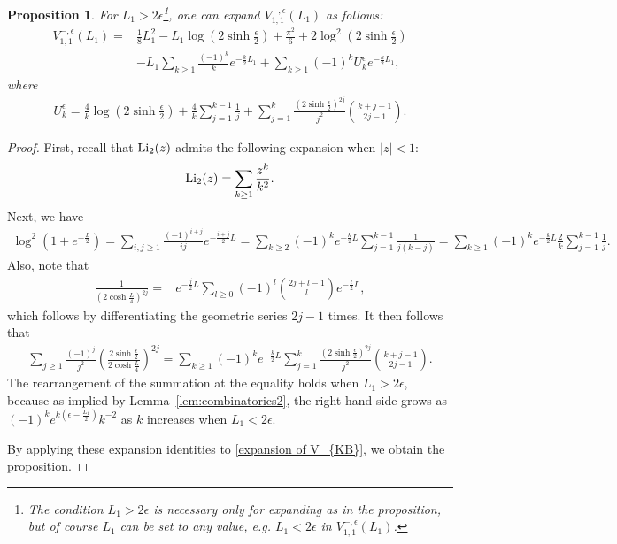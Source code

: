 \documentclass[12pt]{amsart}
\theoremstyle{plain}
\newtheorem{proposition}[theorem]{Proposition}
\theoremstyle{definition}
\theoremstyle{remark}
\numberwithin{equation}{section}
\begin{document}
\begin{proposition}\label{prop:expansion of V_KB} For $L_1>2\epsilon$\footnote{The condition $L_1>2\epsilon$ is necessary only for expanding as in the proposition, but of course $L_1$ can be set to any value, e.g. $L_1<2\epsilon$ in $V_{1,1}^{-,\epsilon}(L_1)$.}, one can expand $V_{1,1}^{-,\epsilon}(L_1)$ as follows:
\begin{align*}
        V_{1,1}^{-,\epsilon}(L_1)=&\frac{1}{8}L_1^2-L_1\log\left(2\sinh\frac{\epsilon}{2}\right)+\frac{\pi^2}{6}+2\log^2\left(2\sinh\frac{\epsilon}{2}\right)\nonumber\\
        &-L_1\sum_{k\geq1}\frac{(-1)^k}{k}e^{-\frac{k}{2}L_1}+\sum_{k\geq1}(-1)^k U^\epsilon_ke^{-\frac{k}{2}L_1},
    \end{align*}
    where
    \begin{align}
        U^\epsilon_k=\frac{4}{k}\log\left(2\sinh\frac{\epsilon}{2}\right)+\frac{4}{k}\sum_{j=1}^{k-1}\frac{1}{j}+\sum_{j=1}^k\frac{\left(2\sinh\frac{\epsilon}{2}\right)^{2j}}{j^2}\binom{k+j-1}{2j-1}.\label{U for 1,1}
    \end{align}    
\end{proposition}
    
\begin{proof}
    First, recall that ${\rm Li}_2(z)$ admits the following expansion when $|z|<1$:
    \begin{equation*}
    {\rm Li}_2(z) = \sum_{k\geq1}\frac{z^k}{k^2}.
    \end{equation*}
    Next, we have
    \begin{align*}
        \log^2\left(1+e^{-\frac{L}{2}}\right)=\sum_{i,j\geq1}\frac{(-1)^{i+j}}{ij}e^{-\frac{i+j}{2}L}=\sum_{k\geq2}(-1)^ke^{-\frac{k}{2}L}\sum_{j=1}^{k-1}\frac{1}{j(k-j)}=\sum_{k\geq1}(-1)^ke^{-\frac{k}{2}L}\frac{2}{k}\sum_{j=1}^{k-1}\frac{1}{j}.
    \end{align*}
    Also, note that
    \begin{align*}
        \frac{1}{\left(2\cosh\frac{L}{4}\right)^{2j}}=&e^{-\frac{j}{2}L}\sum_{l\geq0}(-1)^l\binom{2j+l-1}{l}e^{-\frac{l}{2}L},
    \end{align*}
    which follows by differentiating the geometric series $2j-1$ times. It then follows that
    \begin{align*}
        \sum_{j\geq1}\frac{(-1)^j}{j^2}\left(\frac{2\sinh\frac{\epsilon}{2}}{2\cosh\frac{L}{4}}\right)^{2j}=\sum_{k\geq1}(-1)^ke^{-\frac{k}{2}L}\sum_{j=1}^{k}\frac{\left(2\sinh\frac{\epsilon}{2}\right)^{2j}}{j^2}\binom{k+j-1}{2j-1}.
    \end{align*}
The rearrangement of the summation at the equality holds when $L_1>2\epsilon$, because as implied by Lemma~\ref{lem:combinatorics2}, the right-hand side grows as $(-1)^ke^{k(\epsilon-\frac{L_1}{2})}k^{-2}$ as $k$ increases when $L_1<2\epsilon$. 

By applying these expansion identities to \eqref{expansion of V_{KB}}, we obtain the proposition. 
\end{proof}
\end{document}
